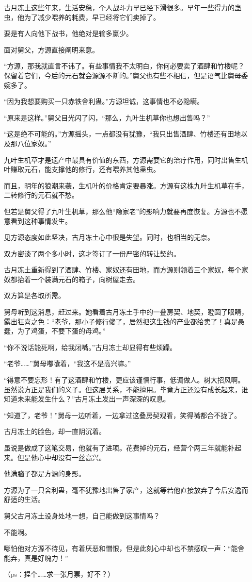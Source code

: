 \begin{this_body}
古月冻土这些年来，生活安稳，个人战斗力早已经下滑很多。早年一些得力的蛊虫，他为了减少喂养的耗费，早已经将它们卖掉了。

要是有人向他下战书，他绝对是输多赢少。

面对舅父，方源直接阐明来意。

“方源，那我就直言不讳了。有些事情我不太明白，你何必要卖了酒肆和竹楼呢？保留着它们，今后的元石就会源源不断的。”舅父也有些不相信，但是语气比舅母委婉多了。

“因为我想要购买一只赤铁舍利蛊。”方源坦诚，这事情也不必隐瞒。

“原来是这样。”舅父目光闪了闪，“那么，九叶生机草你也想出售吗？”

“这是绝不可能的。”方源摇头，一点都没有犹豫，“我只出售酒肆、竹楼还有田地以及那八位家奴。”

九叶生机草才是遗产中最具有价值的东西，方源需要它的治疗作用，同时出售生机叶赚取元石，能支撑他的修行，还有喂养其他蛊虫。

而且，明年的狼潮来袭，生机叶的价格肯定要暴涨。方源有这株九叶生机草在手，二转修行的元石就不愁。

但若是舅父得了九叶生机草，那么他“隐家老”的影响力就要再度恢复。方源也不愿意看到这种事情发生。

见方源态度如此坚决，古月冻土心中很是失望。同时，也相当的无奈。

双方密谈了两个多小时，这才签订了一份严密的转让契约。

古月冻土重新得到了酒肆、竹楼、家奴还有田地，而方源则领着三个家奴，每个家奴都抬着一个装满元石的箱子，向树屋走去。

双方算是各取所需。

舅母听到这消息，赶过来。她看着古月冻土手中的一叠房契、地契，瞪圆了眼睛，露出狂喜之色：“老爷，那小子修行傻了，居然把这生钱的产业都给卖了！真是愚蠢，为了鸡蛋，不要下蛋的母鸡。”

“你不说话能死啊，给我闭嘴。”古月冻土却显得有些烦躁。

“老爷……”舅母嘟囔着，“我这不是高兴嘛。”

“得意不要忘形！有了这酒肆和竹楼，更应该谨慎行事，低调做人。树大招风啊。虽然说方正是我们的义子。但这层关系，不能擅用。毕竟方正还没有成长起来，谁知道未来能发生什么？”古月冻土发出一声深深的叹息。

“知道了，老爷！”舅母一边听着，一边拿过这叠房契观看，笑得嘴都合不拢了。

古月冻土的脸色，却一直阴沉着。

虽说是做成了这笔交易，他就有了进项。花费掉的元石，经营个两三年就能补起来。但是他心中却没有一丝高兴。

他满脑子都是方源的身影。

方源为了一只舍利蛊，毫不犹豫地出售了家产，这就等若他直接放弃了今后安逸而舒适的生活。

舅父古月冻土设身处地一想，自己能做到这事情吗？

不能啊。

哪怕他对方源不待见，有着厌恶和憎恨，但是此刻心中却也不禁感叹一声：“能舍能弃，真是好魄力！”

（ps：捏个……求一张月票，好不？）

\end{this_body}

